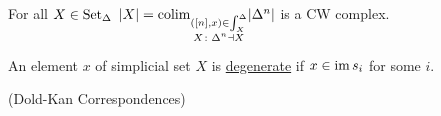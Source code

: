 \begin{thm}
    For all $X \in \operatorname{Set}_{\Delta}$ $\lvert X \rvert = \operatorname{colim}_{\substack{([n],x)\in \int_X^\Delta \\
    X\colon \Delta^n \dashv X} }\lvert \Delta^n\rvert$ is a CW complex.
\end{thm}

\begin{defi}
    An element $x$ of simplicial set $X$ is \underline{degenerate} if $x \in \operatorname{im} s_i$ for some $i$.
\end{defi}

\begin{thm}(Dold-Kan Correspondences)

\end{thm}